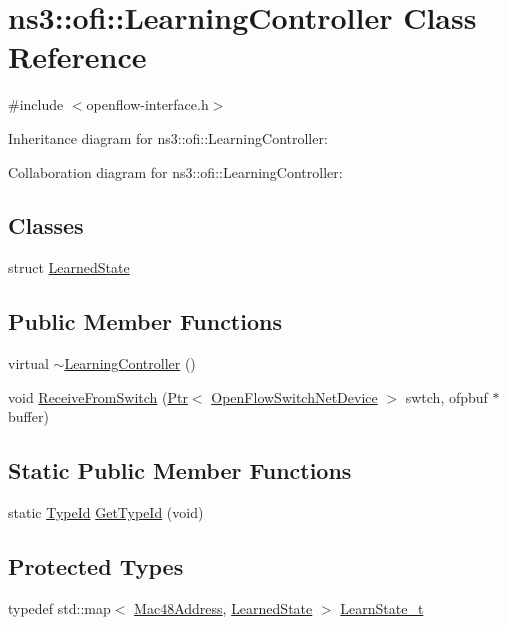 \hypertarget{classns3_1_1ofi_1_1LearningController}{}\section{ns3\+:\+:ofi\+:\+:Learning\+Controller Class Reference}
\label{classns3_1_1ofi_1_1LearningController}


{\ttfamily \#include $<$openflow-\/interface.\+h$>$}



Inheritance diagram for ns3\+:\+:ofi\+:\+:Learning\+Controller\+:


Collaboration diagram for ns3\+:\+:ofi\+:\+:Learning\+Controller\+:
\subsection*{Classes}
\begin{DoxyCompactItemize}
\item 
struct \hyperlink{structns3_1_1ofi_1_1LearningController_1_1LearnedState}{Learned\+State}
\end{DoxyCompactItemize}
\subsection*{Public Member Functions}
\begin{DoxyCompactItemize}
\item 
virtual \hyperlink{classns3_1_1ofi_1_1LearningController_aa4dec7351956643102d9c58e183345e8}{$\sim$\+Learning\+Controller} ()
\item 
void \hyperlink{classns3_1_1ofi_1_1LearningController_a53c7efe382b753e3a434a34ba391933d}{Receive\+From\+Switch} (\hyperlink{classns3_1_1Ptr}{Ptr}$<$ \hyperlink{classns3_1_1OpenFlowSwitchNetDevice}{Open\+Flow\+Switch\+Net\+Device} $>$ swtch, ofpbuf $\ast$buffer)
\end{DoxyCompactItemize}
\subsection*{Static Public Member Functions}
\begin{DoxyCompactItemize}
\item 
static \hyperlink{classns3_1_1TypeId}{Type\+Id} \hyperlink{classns3_1_1ofi_1_1LearningController_a18dc968a92a510066961511b83a29cb7}{Get\+Type\+Id} (void)
\end{DoxyCompactItemize}
\subsection*{Protected Types}
\begin{DoxyCompactItemize}
\item 
typedef std\+::map$<$ \hyperlink{classns3_1_1Mac48Address}{Mac48\+Address}, \hyperlink{structns3_1_1ofi_1_1LearningController_1_1LearnedState}{Learned\+State} $>$ \hyperlink{classns3_1_1ofi_1_1LearningController_a86da4aa2ed2b125a6a93b3b06a404c3f}{Learn\+State\+\_\+t}
\end{DoxyCompactItemize}
